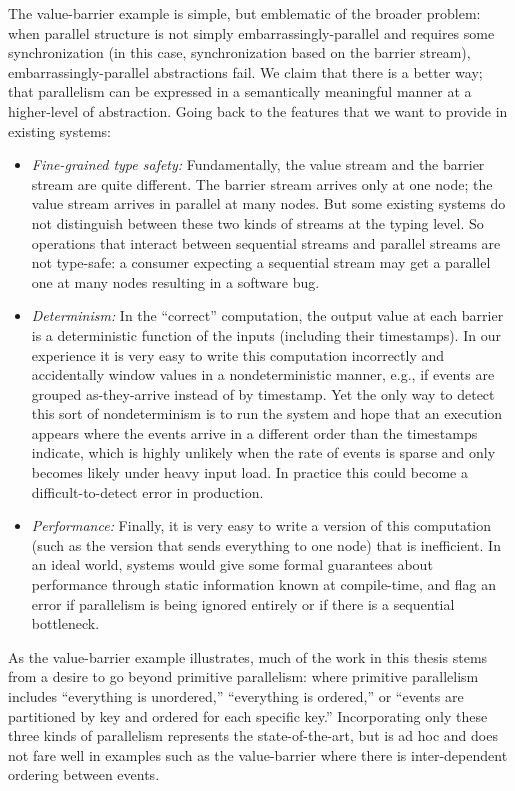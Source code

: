 The value-barrier example is simple, but emblematic of the broader problem: when parallel structure is not simply embarrassingly-parallel and requires some synchronization (in this case, synchronization based on the barrier stream), embarrassingly-parallel abstractions fail.
We claim that there is a better way; that parallelism can be expressed in a semantically meaningful manner at a higher-level of abstraction.
Going back to the features that we want to provide in existing systems:
\begin{itemize}
  \item \emph{Fine-grained type safety:} Fundamentally, the value stream and the barrier stream are quite different. The barrier stream arrives only at one node; the value stream arrives in parallel at many nodes. But some existing systems do not distinguish between these two kinds of streams at the typing level. So operations that interact between sequential streams and parallel streams are not type-safe: a consumer expecting a sequential stream may get a parallel one at many nodes resulting in a software bug.
  \item \emph{Determinism:} In the ``correct'' computation, the output value at each barrier is a deterministic function of the inputs (including their timestamps). In our experience it is very easy to write this computation incorrectly and accidentally window values in a nondeterministic manner, e.g., if events are grouped as-they-arrive instead of by timestamp. Yet the only way to detect this sort of nondeterminism is to run the system and hope that an execution appears where the events arrive in a different order than the timestamps indicate, which is highly unlikely when the rate of events is sparse and only becomes likely under heavy input load. In practice this could become a difficult-to-detect error in production.
  \item \emph{Performance:} Finally, it is very easy to write a version of this computation (such as the \naive{} version that sends everything to one node) that is inefficient. In an ideal world, systems would give some formal guarantees about performance through static information known at compile-time, and flag an error if parallelism is being ignored entirely or if there is a sequential bottleneck.
\end{itemize}

As the value-barrier example illustrates, much of the work in this thesis stems from a desire to go beyond primitive parallelism: where primitive parallelism includes ``everything is unordered,'' ``everything is ordered,'' or ``events are partitioned by key and ordered for each specific key.'' Incorporating only these three kinds of parallelism represents the state-of-the-art, but is ad hoc and does not fare well in examples such as the value-barrier where there is inter-dependent ordering between events.

